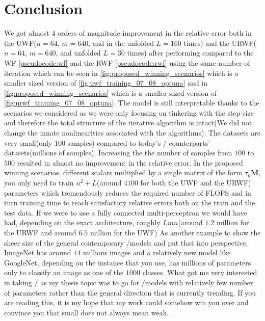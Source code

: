 \chapter{Conclusion}

We got almost $4$ orders of magnitude improvement in the relative error both in the \ac{UWF}($n=64$, $m=640$, 
and in the unfolded $L=160$ times) and the \ac{URWF}($n=64$, $m=640$, and unfolded $L=30$ times) after performing 
\ho \cite{Hutter2019}\cite{Akiba2019}\index{\hp} compared to the \ac{WF}\cite{Candes2014} 
\cref{pseudocode:wf} and the \ac{RWF}\cite{Zhang2016} 
\cref{pseudocode:rwf} using the same number of iteration which can be seen in 
\cref{fig:proposed_winning_scenarios} which is a smaller sized version of \cref{fig:uwf_training_07_08_optuna} and 
in \cref{fig:proposed_winning_scenarios} which is a smaller sized version of \cref{fig:urwf_training_07_08_optuna}. The model is still 
interpretable thanks to the scenarios we considered as we were only focusing on tinkering with the step size and therefore 
the total structure of the iterative algorithm is intact(We did not change the innate nonlinearities associated with the algorithms). 
The datasets are very small(only $100$ samples) compared to today's \ml/\dl \cite{Goodfellow2016}\cite{LeCun2015} 
counterparts' \cite{Krizhevsky2017}\cite{Szegedy2014} datasets(millions of samples). Increasing the the number of samples from $100$ to $500$ resulted in almost 
no improvement in the relative error. In the proposed winning scenarios, different scalars multiplied by a single matrix of the form $\tau_k\boldsymbol{M}$, you only need to train 
$n^2+L$(around $4100$ for both the \ac{UWF} and the \ac{URWF}) parameters which tremendously reduces the required number of 
\ac{FLOPS}\cite{Hager2010}\cite{Hennessy2019} and in turn training time to reach satisfactory 
relative errors both on the train and the test data. If we were to use a fully connected multi-perceptron \nn we would have 
had, depending on the exact architecture, roughly $Lmn$(around $1.2$ million for the \ac{URWF} and around $6.5$ million for the \ac{UWF}) 
As another example to show the sheer size of the general contemporary \ml/\dl models and put that into perspective, 
ImageNet\cite{SVLL2021} has around $14$ millions images and a relatively new model like GoogleNet\cite{Szegedy2014}, 
depending on the instance that you use, has millions of parameters only to classify an image as one of the $1000$ 
classes. What got me very interested in taking \du/\au\cite{Monga2019} as my thesis topic was to go for \ml/\dl models with relatively few number of parameters 
rather than the general direction that is currently trending. If you are reading this, it is my hope that my work could 
somehow win you over and convince you that small does not always mean weak.


